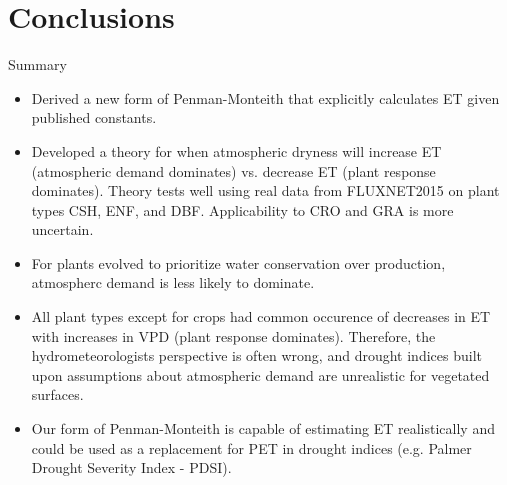 \documentclass{beamer}
\begin{document}
\section{Conclusions}


\begin{frame}{Summary}
  \small
  \begin{itemize}
  \item Derived a new form of Penman-Monteith that explicitly calculates ET given published constants.
  \item Developed a theory for when atmospheric dryness will increase ET (atmospheric demand dominates) vs. decrease ET (plant response dominates). Theory tests well using real data from FLUXNET2015 on plant types CSH, ENF, and DBF. Applicability to CRO and GRA is more uncertain.
  \item For plants evolved to prioritize water conservation over production, atmospherc demand is less likely to dominate.
  \item All plant types except for crops had common occurence of decreases in ET with increases in VPD (plant response dominates). Therefore, the hydrometeorologists perspective is often wrong, and drought indices built upon assumptions about atmospheric demand are unrealistic for vegetated surfaces.
  \item Our form of Penman-Monteith is capable of estimating ET realistically and could be used as a replacement for PET in drought indices (e.g. Palmer Drought Severity Index - PDSI).
  \end{itemize}
\end{frame}
  
\end{document}
